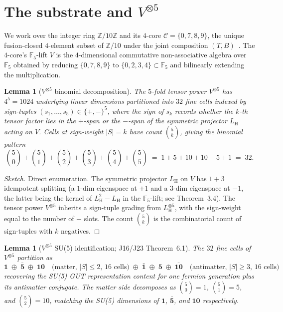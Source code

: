 \documentclass[11pt,reqno]{amsart}
\theoremstyle{plain}
\newtheorem{lemma}[theorem]{Lemma}
\theoremstyle{definition}
\theoremstyle{remark}
\newcommand{\Z}{\mathbb{Z}}
\newcommand{\F}{\mathbb{F}}
\DeclareMathOperator{\HARM}{H}    %
\newcommand{\Cfour}{\mathcal{C}}  %
\newcommand{\rep}[1]{\mathbf{#1}}
\newcommand{\barrep}[1]{\bar{\mathbf{#1}}}
\begin{document}
\section{The substrate and \texorpdfstring{$V^{\otimes 5}$}{V tensor 5}}\label{sec:setup}

We work over the integer ring $\Z/10\Z$ and its $4$-core
$\Cfour = \{0, 7, 8, 9\}$, the unique fusion-closed $4$-element
subset of $\Z/10$ under the joint composition $(T,
B)$~\cite{SandersGish2026FourCore}. The $4$-core's $\F_5$-lift
$V$ is the $4$-dimensional commutative non-associative algebra
over $\F_5$ obtained by reducing $\{0,7,8,9\}$ to
$\{0,2,3,4\} \subset \F_5$ and bilinearly extending the
multiplication.

\begin{lemma}[$V^{\otimes 5}$ binomial decomposition]\label{lem:binomial}
The $5$-fold tensor power $V^{\otimes 5}$ has $4^{5} = 1024$
underlying linear dimensions partitioned into $32$ fine cells
indexed by sign-tuples $(s_{1}, \ldots, s_{5}) \in \{+,-\}^{5}$,
where the sign of $s_{k}$ records whether the $k$-th tensor
factor lies in the $+$-span or the $-$-span of the symmetric
projector $L_{\HARM}$ acting on $V$. Cells at sign-weight
$|S| = k$ have count $\binom{5}{k}$, giving the binomial pattern
\[
  \binom{5}{0} + \binom{5}{1} + \binom{5}{2} + \binom{5}{3} + \binom{5}{4} + \binom{5}{5}
  \;=\; 1 + 5 + 10 + 10 + 5 + 1 \;=\; 32.
\]
\end{lemma}

\begin{proof}[Sketch]
Direct enumeration. The symmetric projector $L_{\HARM}$ on $V$
has $1+3$ idempotent splitting (a $1$-dim eigenspace at $+1$
and a $3$-dim eigenspace at $-1$, the latter being the kernel
of $L_{\HARM}^2 - L_{\HARM}$ in the $\F_5$-lift; see
\cite{SandersGish2026DiscreteDirac} Theorem~3.4). The tensor
power $V^{\otimes 5}$ inherits a sign-tuple grading from
$L_{\HARM}^{\otimes 5}$, with the sign-weight equal to the
number of $-$ slots. The count $\binom{5}{k}$ is the
combinatorial count of sign-tuples with $k$ negatives.
\end{proof}

\begin{lemma}[$V^{\otimes 5}$ SU(5) identification; J16/J23 Theorem~6.1]\label{lem:vtensor5}
The $32$ fine cells of $V^{\otimes 5}$ partition as
\[
  \rep{1} \;\oplus\; \barrep{5} \;\oplus\; \rep{10}
  \quad \text{(matter, $|S| \leq 2$, $16$ cells)}
  \;\oplus\;
  \barrep{1} \;\oplus\; \rep{5} \;\oplus\; \barrep{10}
  \quad \text{(antimatter, $|S| \geq 3$, $16$ cells)}
\]
recovering the SU(5) GUT representation content for one
fermion generation plus its antimatter conjugate. The matter
side decomposes as $\binom{5}{0} = 1$, $\binom{5}{1} = 5$, and
$\binom{5}{2} = 10$, matching the SU(5) dimensions of $\rep{1}$,
$\barrep{5}$, and $\rep{10}$ respectively.
\end{lemma}
\end{document}
